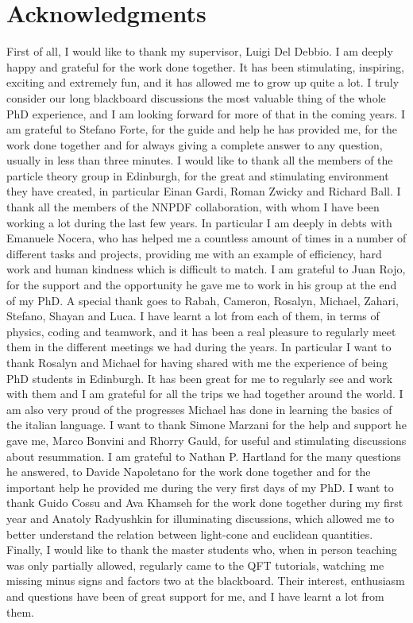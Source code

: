 \chapter*{Acknowledgments}
%
First of all, I would like to thank my supervisor, Luigi Del Debbio.
I am deeply happy and grateful for the work done together.
It has been stimulating, inspiring, exciting and extremely fun, and it has allowed me to grow up
quite a lot.
I truly consider our long blackboard discussions the most valuable thing of the whole PhD experience, and
I am looking forward for more of that in the coming years.
%
I am grateful to Stefano Forte, for the guide and help he has provided me, for the work done together 
and for always giving a complete answer to any question, usually in less than three minutes.
I would like to thank all the members of the particle theory group in Edinburgh, for the 
great and stimulating environment they have created, in particular Einan Gardi, Roman Zwicky and Richard Ball. 
%
I thank all the members of the NNPDF collaboration, with whom I have been working a lot during the last
few years. In particular I am deeply in debts with Emanuele Nocera, who has helped me a countless amount of 
times in a number of different tasks and projects, providing me with an example of efficiency, hard work and human kindness which
is difficult to match. I am grateful to Juan Rojo, for the support and the opportunity he gave me to work in his group
at the end of my PhD.
%
A special thank goes to Rabah, Cameron, Rosalyn, Michael, Zahari, Stefano, Shayan
and Luca. I have learnt a lot from each of them, in terms of physics, coding and teamwork, and it has been a real pleasure
to regularly meet them in the different meetings we had during the years.
In particular I want to thank Rosalyn and Michael for having shared with me the experience of being PhD students in Edinburgh.
It has been great for me to regularly see and work with them and I am grateful for all the trips
we had together around the world. 
I am also very proud of the progresses Michael has done in learning the basics of the italian language.
%
I want to thank Simone Marzani for the help and support he gave me, Marco Bonvini and Rhorry Gauld, for 
useful and stimulating discussions about resummation.  
%
I am grateful to Nathan P. Hartland for the many questions he answered, to
Davide Napoletano for the work done together and for the important help he provided me during the very first days of my PhD.
I want to thank Guido Cossu and Ava Khamseh for the work done together during my first year
and Anatoly Radyushkin for illuminating discussions, which allowed me to better understand the relation 
between light-cone and euclidean quantities. Finally, I would like to thank the master students who, when 
in person teaching was only partially allowed, regularly came to the QFT tutorials, watching me missing
minus signs and factors two at the blackboard.
Their interest, enthusiasm and questions have been of great support for me, and I have learnt a lot from them. 

